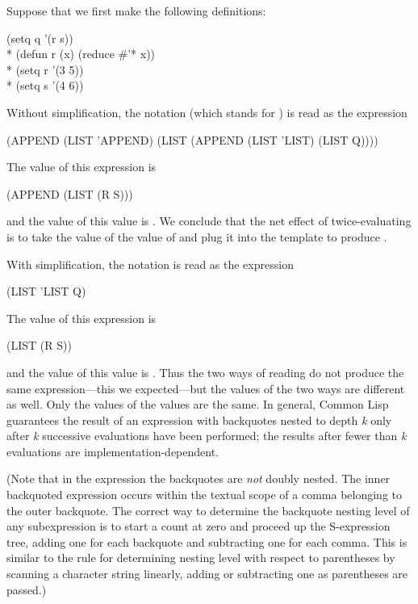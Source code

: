 \begin{new}
Suppose that we first make the following definitions:

\begin{lisp}
(setq q '(r s)) \\*
(defun r (x) (reduce \#'* x)) \\*
(setq r '(3 5)) \\*
(setq s '(4 6))
\end{lisp}

Without simplification, the notation
 (which stands for )
is read as the expression
\begin{lisp}
(APPEND (LIST 'APPEND) (LIST (APPEND (LIST 'LIST) (LIST Q))))
\end{lisp}
The value of this expression is
\begin{lisp}
(APPEND (LIST (R S)))
\end{lisp}
and the value of this value is .  We conclude
that the net effect
of twice-evaluating  is to take
the value  of the value  of 
and plug it into the template \cd{(~)} to produce .

With simplification, the notation
is read as the expression
\begin{lisp}
(LIST 'LIST Q)
\end{lisp}
The value of this expression is
\begin{lisp}
(LIST (R S))
\end{lisp}
and the value of this value is .
Thus the two ways of reading  do not produce the
same expression---this we expected---but the values of the two ways are
different as well.  Only the values of the values are the same.
In general, Common Lisp guarantees the result of
an expression with backquotes nested to depth {\it k} only after
{\it k} successive evaluations have been performed; the results after
fewer than {\it k} evaluations are implementation-dependent.

(Note that in the expression 
the backquotes are {\it not} doubly nested.  The inner backquoted
expression occurs within the textual scope of a comma belonging
to the outer backquote.  The correct way to determine the backquote
nesting level of any subexpression is to start a count at zero and
proceed up the S-expression tree, adding one for each backquote
and subtracting one for each comma.  This is similar to the rule
for determining nesting level with respect to parentheses by scanning
a character string linearly, adding or subtracting one as parentheses
are passed.)


\end{new}
